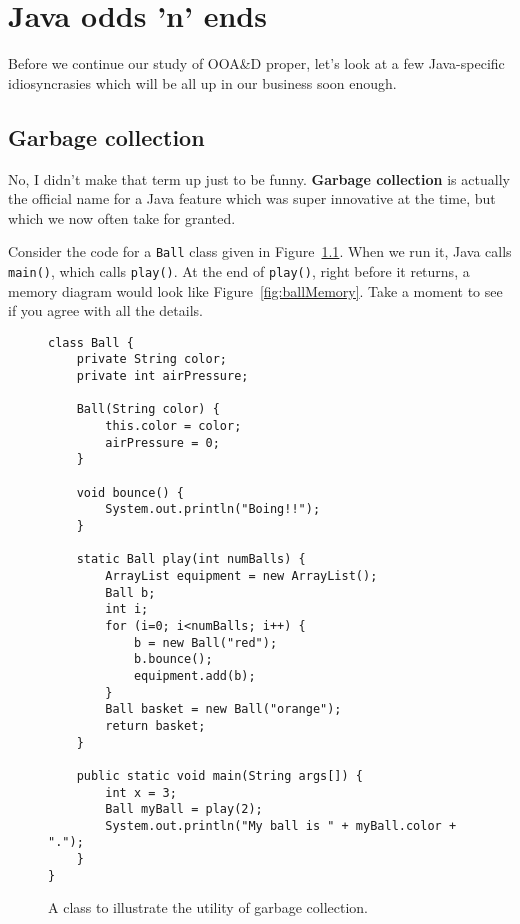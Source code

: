 
\chapter{Java odds 'n' ends}

Before we continue our study of OOA\&D proper, let's look at a few
Java-specific idiosyncrasies which will be all up in our business soon enough.

\section{Garbage collection}

No, I didn't make that term up just to be funny. \textbf{Garbage collection}
is actually the official name for a Java feature which was super innovative at
the time, but which we now often take for granted.

Consider the code for a \texttt{Ball} class given in
Figure~\ref{fig:ballCode}. When we run it, Java calls \texttt{main()}, which
calls \texttt{play()}. At the end of \texttt{play()}, right before it returns,
a memory diagram would look like Figure~\ref{fig:ballMemory}. Take a moment to
see if you agree with all the details.

\begin{figure}[ht]
\begin{Verbatim}[fontsize=\scriptsize,samepage=true,frame=single]
class Ball {
    private String color;
    private int airPressure;

    Ball(String color) {
        this.color = color;
        airPressure = 0;
    }

    void bounce() {
        System.out.println("Boing!!");
    }

    static Ball play(int numBalls) {
        ArrayList equipment = new ArrayList();
        Ball b;
        int i;
        for (i=0; i<numBalls; i++) {
            b = new Ball("red");
            b.bounce();
            equipment.add(b);
        }
        Ball basket = new Ball("orange");
        return basket;
    }

    public static void main(String args[]) {
        int x = 3;
        Ball myBall = play(2);
        System.out.println("My ball is " + myBall.color + ".");
    }
}
\end{Verbatim}
\caption{A class to illustrate the utility of garbage collection.}
\label{fig:ballCode}
\end{figure}


